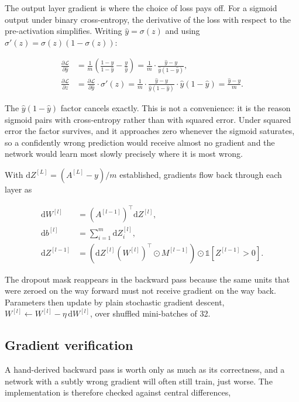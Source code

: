 \documentclass[11pt,a4paper]{article}
\begin{document}
The output layer gradient is where the choice of loss pays off. For a sigmoid
output under binary cross-entropy, the derivative of the loss with respect to the
pre-activation simplifies. Writing $\hat{y} = \sigma(z)$ and using
$\sigma'(z) = \sigma(z)(1-\sigma(z))$:

\begin{align}
\frac{\partial \mathcal{L}}{\partial \hat{y}}
  &= \frac{1}{m}\left(\frac{1-y}{1-\hat{y}} - \frac{y}{\hat{y}}\right)
   = \frac{1}{m}\cdot\frac{\hat{y}-y}{\hat{y}(1-\hat{y})},\\[0.5em]
\frac{\partial \mathcal{L}}{\partial z}
  &= \frac{\partial \mathcal{L}}{\partial \hat{y}} \cdot \sigma'(z)
   = \frac{1}{m}\cdot\frac{\hat{y}-y}{\hat{y}(1-\hat{y})} \cdot \hat{y}(1-\hat{y})
   = \frac{\hat{y}-y}{m}.
\end{align}

The $\hat{y}(1-\hat{y})$ factor cancels exactly. This is not a convenience: it is
the reason sigmoid pairs with cross-entropy rather than with squared error. Under
squared error the factor survives, and it approaches zero whenever the sigmoid
saturates, so a confidently wrong prediction would receive almost no gradient and
the network would learn most slowly precisely where it is most wrong.

With $\mathrm{d}Z^{[L]} = (A^{[L]} - y)/m$ established, gradients flow back
through each layer as

\begin{align}
\mathrm{d}W^{[l]} &= \left(A^{[l-1]}\right)^{\!\top} \mathrm{d}Z^{[l]},\\
\mathrm{d}b^{[l]} &= \sum_{i=1}^{m} \mathrm{d}Z^{[l]}_{i},\\
\mathrm{d}Z^{[l-1]} &= \left(\mathrm{d}Z^{[l]} \left(W^{[l]}\right)^{\!\top}
  \odot M^{[l-1]}\right) \odot \mathbb{1}\!\left[Z^{[l-1]} > 0\right].
\end{align}

The dropout mask reappears in the backward pass because the same units that were
zeroed on the way forward must not receive gradient on the way back. Parameters
then update by plain stochastic gradient descent,
$W^{[l]} \leftarrow W^{[l]} - \eta\,\mathrm{d}W^{[l]}$, over shuffled mini-batches
of 32.

\subsection{Gradient verification}

A hand-derived backward pass is worth only as much as its correctness, and a
network with a subtly wrong gradient will often still train, just worse. The
implementation is therefore checked against central differences,
\end{document}
